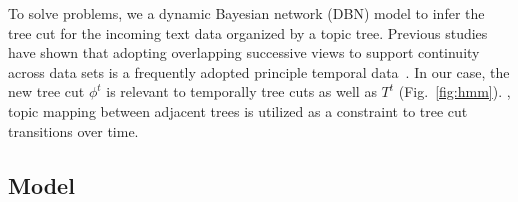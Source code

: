 To solve  problems, we  a dynamic Bayesian network (DBN) model to infer the tree cut for the incoming text data organized by a topic tree.
Previous studies have shown that adopting overlapping successive views to support continuity across data sets is a frequently adopted principle  temporal data~\cite{Chakrabarti2006,Woods1984}.
In our case, the new tree cut ${\phi}^t$ is relevant to temporally  tree cuts as well as $T^t$ (Fig.~\ref{fig:hmm}).
, topic mapping between adjacent trees is utilized as a constraint to  tree cut transitions over time.


\subsection{Model}




